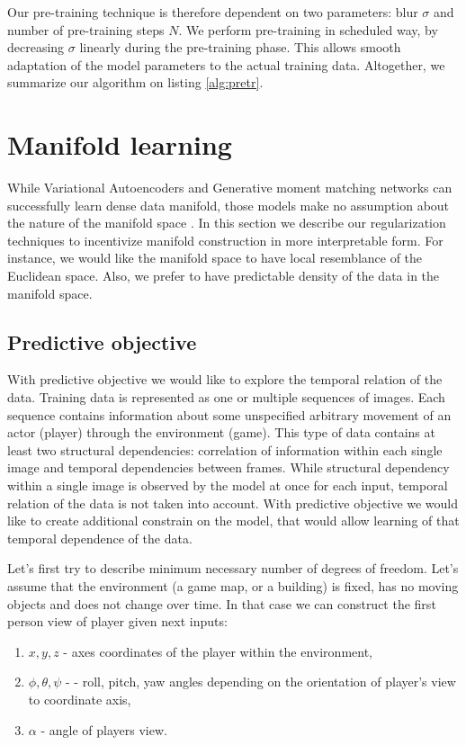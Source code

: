 Our pre-training technique is therefore dependent on two parameters: blur $\sigma$ and number of pre-training steps $N$.
We perform pre-training in scheduled way, by decreasing $\sigma$ linearly during the pre-training phase.
This allows smooth adaptation of the model parameters to the actual training data.
Altogether, we summarize our algorithm on listing \ref{alg:pretr}.



\section{Manifold learning}\label{ss:mf}

While Variational Autoencoders and Generative moment matching networks can successfully learn dense data manifold, those models make no assumption about the nature of the manifold space \cite{Li2015, Ren2016, Kingma2013}.
In this section we describe our regularization techniques to incentivize manifold construction in more interpretable form.
For instance, we would like the manifold space to have local resemblance of the Euclidean space.
Also, we prefer to have predictable density of the data in the manifold space.

\subsection{Predictive objective}

With predictive objective we would like to explore the temporal relation of the data.
Training data is represented as one or multiple sequences of images.
Each sequence contains information about some unspecified arbitrary movement of an actor (player) through the environment (game).
This type of data contains at least two structural dependencies: correlation of information within each single image and temporal dependencies between frames.
While structural dependency within a single image is observed by the model at once for each input, temporal relation of the data is not taken into account.
With predictive objective we would like to create additional constrain on the model, that would allow learning of that temporal dependence of the data.

Let's first try to describe minimum necessary number of degrees of freedom.
Let's assume that the environment (a game map, or a building) is fixed, has no moving objects and does not change over time.
In that case we can construct the first person view of player given next inputs:
\begin{enumerate}
  \item $x, y, z$ - axes coordinates of the player within the environment,
  \item $\phi, \theta, \psi$ -  - roll, pitch, yaw angles depending on the orientation of player's view to coordinate axis,
  \item $\alpha$ - angle of players view.
\end{enumerate}


